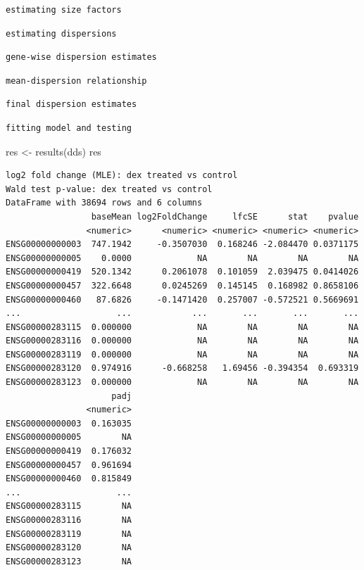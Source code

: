 \documentclass[
  letterpaper,
  DIV=11,
  numbers=noendperiod]{scrartcl}
\newenvironment{Shaded}{\begin{snugshade}}{\end{snugshade}}
\newcommand{\FunctionTok}[1]{\textcolor[rgb]{0.28,0.35,0.67}{#1}}
\newcommand{\NormalTok}[1]{\textcolor[rgb]{0.00,0.23,0.31}{#1}}
\newcommand{\OtherTok}[1]{\textcolor[rgb]{0.00,0.23,0.31}{#1}}
\begin{document}
\begin{verbatim}
estimating size factors
\end{verbatim}

\begin{verbatim}
estimating dispersions
\end{verbatim}

\begin{verbatim}
gene-wise dispersion estimates
\end{verbatim}

\begin{verbatim}
mean-dispersion relationship
\end{verbatim}

\begin{verbatim}
final dispersion estimates
\end{verbatim}

\begin{verbatim}
fitting model and testing
\end{verbatim}

\begin{Shaded}
\begin{Highlighting}[]
\NormalTok{res }\OtherTok{\textless{}{-}} \FunctionTok{results}\NormalTok{(dds)}
\NormalTok{res}
\end{Highlighting}
\end{Shaded}

\begin{verbatim}
log2 fold change (MLE): dex treated vs control 
Wald test p-value: dex treated vs control 
DataFrame with 38694 rows and 6 columns
                 baseMean log2FoldChange     lfcSE      stat    pvalue
                <numeric>      <numeric> <numeric> <numeric> <numeric>
ENSG00000000003  747.1942     -0.3507030  0.168246 -2.084470 0.0371175
ENSG00000000005    0.0000             NA        NA        NA        NA
ENSG00000000419  520.1342      0.2061078  0.101059  2.039475 0.0414026
ENSG00000000457  322.6648      0.0245269  0.145145  0.168982 0.8658106
ENSG00000000460   87.6826     -0.1471420  0.257007 -0.572521 0.5669691
...                   ...            ...       ...       ...       ...
ENSG00000283115  0.000000             NA        NA        NA        NA
ENSG00000283116  0.000000             NA        NA        NA        NA
ENSG00000283119  0.000000             NA        NA        NA        NA
ENSG00000283120  0.974916      -0.668258   1.69456 -0.394354  0.693319
ENSG00000283123  0.000000             NA        NA        NA        NA
                     padj
                <numeric>
ENSG00000000003  0.163035
ENSG00000000005        NA
ENSG00000000419  0.176032
ENSG00000000457  0.961694
ENSG00000000460  0.815849
...                   ...
ENSG00000283115        NA
ENSG00000283116        NA
ENSG00000283119        NA
ENSG00000283120        NA
ENSG00000283123        NA
\end{verbatim}
\end{document}
